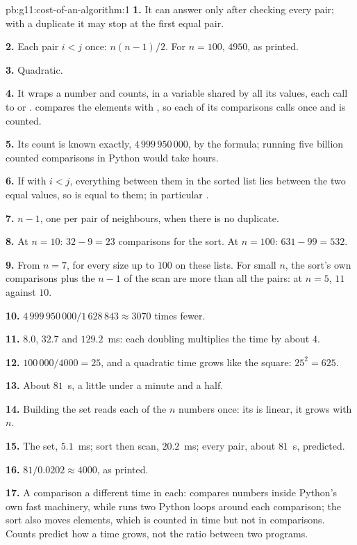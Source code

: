 \begin{solution}{pb:g11:cost-of-an-algorithm:1}
\textbf{1.} It can answer  only after checking every pair; with a duplicate it may stop at the first equal
pair.

\textbf{2.} Each pair $i < j$ once: $n(n - 1)/2$. For $n = 100$, $4950$, as printed.

\textbf{3.} Quadratic.

\textbf{4.} It wraps a number and counts, in a variable shared by all its values, each call to \code{<} or \code{==}.
 compares the elements with \code{<}, so each of its comparisons calls  once and is
counted.

\textbf{5.} Its count is known exactly, $4\,999\,950\,000$, by the formula; running five billion counted comparisons in
Python would take hours.

\textbf{6.} If  with $i < j$, everything between them in the sorted list lies between the two equal
values, so is equal to them; in particular .

\textbf{7.} $n - 1$, one per pair of neighbours, when there is no duplicate.

\textbf{8.} At $n = 10$: $32 - 9 = 23$ comparisons for the sort. At $n = 100$: $631 - 99 = 532$.

\textbf{9.} From $n = 7$, for every size up to $100$ on these lists. For small $n$, the sort's own comparisons plus the
$n - 1$ of the scan are more than all the pairs: at $n = 5$, $11$ against $10$.

\textbf{10.} $4\,999\,950\,000 / 1\,628\,843 \approx 3070$ times fewer.

\textbf{11.} $8.0$, $32.7$ and $129.2$~ms: each doubling multiplies the time by about $4$.

\textbf{12.} $100\,000 / 4000 = 25$, and a quadratic time grows like the square: $25^2 = 625$.

\textbf{13.} About $81$~s, a little under a minute and a half.

\textbf{14.} Building the set reads each of the $n$ numbers once: its  is linear, it grows with $n$.

\textbf{15.} The set, $5.1$~ms; sort then scan, $20.2$~ms; every pair, about $81$~s, predicted.

\textbf{16.} $81 / 0.0202 \approx 4000$, as printed.

\textbf{17.} A comparison  a different time in each:  compares numbers inside Python's own fast
machinery, while  runs two Python loops around each comparison; the sort also moves elements, which is
counted in time but not in comparisons. Counts predict how a time grows, not the ratio between two programs.


\end{solution}

